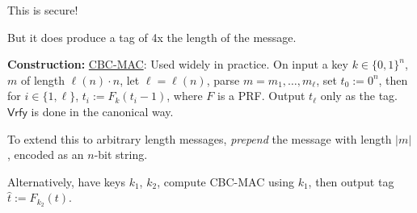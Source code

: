 \documentclass[12pt]{article}
\newcommand{\con}[1]{{\bf Construction:} \underline{#1}}
\newcommand{\Vrfy}{\mathsf{Vrfy}}
\begin{document}
\begin{multicols}{3}
This is secure!

But it does produce a tag of 4x the length of the message.

\con{CBC-MAC}: Used widely in practice. On input a key $k\in\{0,1\}^n$, $m$ of length $\ell(n)\cdot n$, let $\ell=\ell(n)$, parse $m=m_1,\dots,m_\ell$, set $t_0:=0^n$, then for $i\in\{1,\ell\}$, $t_i:=F_k(t_i-1)$, where $F$ is a PRF. Output $t_\ell$ only as the tag. $\Vrfy$ is done in the canonical way.

To extend this to arbitrary length messages, {\it prepend} the message with length $|m|$, encoded as an $n$-bit string.

Alternatively, have keys $k_1$, $k_2$, compute CBC-MAC using $k_1$, then output tag $\hat{t}:=F_{k_2}(t)$.

\end{multicols}
\end{document}
